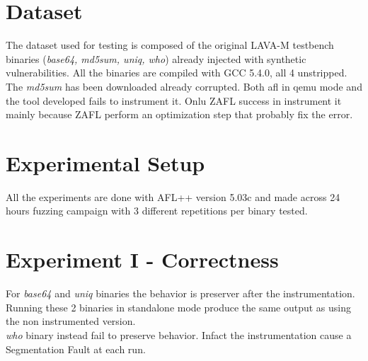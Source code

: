 \documentclass{report}
\begin{document}
            \section{Dataset}
                The dataset used for testing is composed of the original LAVA-M testbench binaries (\textit{base64, md5sum, uniq, who}) 
                already injected with synthetic vulnerabilities.
                All the binaries are compiled with GCC 5.4.0, all 4 unstripped.
                The \textit{md5sum} has been downloaded already corrupted. Both afl in qemu mode and the tool developed fails to instrument it.
                Onlu ZAFL success in instrument it mainly because ZAFL perform an optimization step that probably fix the error.

            \section{Experimental Setup}
                All the experiments are done with AFL++ version 5.03c and made across 24 hours fuzzing campaign with 3 different repetitions per binary tested.
            \section{Experiment I - Correctness}
                For \textit{base64} and \textit{uniq} binaries the behavior is preserver after the instrumentation.
                Running these 2 binaries in standalone mode produce the same output as using the non instrumented version.\\
                \textit{who} binary instead fail to preserve behavior. Infact the instrumentation cause a Segmentation Fault at each run. 
\end{document}
